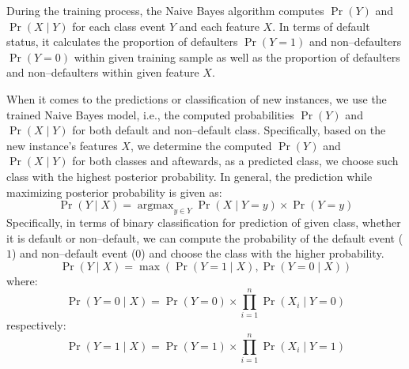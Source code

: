 During the training process, the Naive Bayes algorithm computes $\operatorname{Pr}\left(Y\right)$ and $ \operatorname{Pr}\left(X \mid Y \right)$ for each class event $Y$ and each feature $X$.
In terms of default status, it calculates the proportion of defaulters  $\operatorname{Pr}\left(Y = 1\right)$ and non--defaulters $\operatorname{Pr}\left(Y=0\right)$ within given training sample as well as the proportion of defaulters and non--defaulters within given feature $X$.


When it comes to the predictions or classification of new instances, we use the trained Naive Bayes model, i.e., the computed probabilities $\operatorname{Pr}\left(Y\right)$ and $ \operatorname{Pr}\left(X \mid Y \right)$ for both default and non--default class.
Specifically, based on the new instance's features $X$, we determine the computed $\operatorname{Pr}\left(Y\right)$ and $ \operatorname{Pr}\left(X \mid Y \right)$ for both classes and aftewards, as a predicted class, we choose such class with the highest posterior probability. In general, the prediction while maximizing posterior probability is given as:
\begin{equation}\label{eq:nb-corrected}
    \operatorname{Pr}\left(Y \mid X \right) = \operatorname{argmax}_{y \in Y} \operatorname{Pr}\left(X \mid Y = y\right) \times \operatorname{Pr}(Y = y)
\end{equation}
Specifically, in terms of binary classification for prediction of given class, whether it is default or non--default, we can compute the probability of the default event ($1$) and non--default event ($0$) and choose the class with the higher probability.
\begin{equation}\label{eq}
    \operatorname{Pr}\left(Y \mid X \right)  = \max \left(\operatorname{Pr}\left(Y=1 \mid X\right), \operatorname{Pr}\left(Y=0 \mid X\right)\right)
\end{equation}
where:
\begin{equation}
    \operatorname{Pr}\left(Y=0 \mid X \right) = \operatorname{Pr}\left(Y=0\right) \times \prod_{i=1}^{n} \operatorname{Pr}\left(X_i \mid Y=0\right)
\end{equation}
respectively:
\begin{equation}
    \operatorname{Pr}\left(Y=1 \mid X \right) = \operatorname{Pr}\left(Y=1\right) \times \prod_{i=1}^{n} \operatorname{Pr}\left(X_i \mid Y=1\right)
\end{equation}

